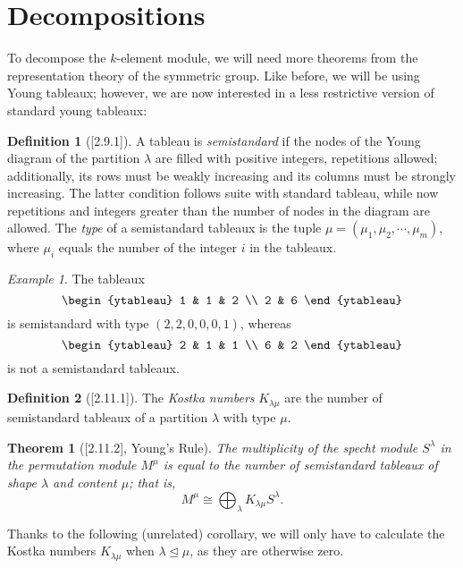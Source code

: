 \documentclass[12pt,twoside]{reedthesis}
\theoremstyle{plain}   %
\newtheorem{thm}{Theorem}[section] %
\theoremstyle{definition}
\newtheorem{defn}{Definition}[section]
\theoremstyle{remark}
\newtheorem{ex}{Example}[section]
\numberwithin{equation}{section}
\def\normeq{\trianglelefteq}
\begin{document}
  \section{Decompositions}
  To decompose the $k$-element module, we will need more theorems from the representation theory of the symmetric group.
  Like before, we will be using Young tableaux; however, we are now interested in a less restrictive version of standard young tableaux:
  \begin{defn}[{\cite{sagan}[2.9.1]}]
    A tableau is \emph{semistandard} if the nodes of the Young diagram of the partition $\lambda$ are filled with positive integers, repetitions allowed;
    additionally, its rows must be weakly increasing and its columns must be strongly increasing.
    The latter condition follows suite with standard tableau, while now repetitions and integers greater than the number of nodes in the diagram are allowed.
    The \emph{type} of a semistandard tableaux is the tuple $\mu = (\mu_1, \mu_2, \cdots, \mu_m)$, where $\mu_i$ equals the number of the integer $i$ in the tableaux.
  \end{defn}
  \begin{ex}
    The tableaux
    \[
      \begin{ytableau}
        1 & 1 & 2 \\
        2 & 6 
      \end{ytableau}
    \]
    is semistandard with type $(2,2,0,0,0,1)$, whereas
    \[
      \begin{ytableau}
        2 & 1 & 1 \\
        6 & 2 
      \end{ytableau}
    \]
    is not a semistandard tableaux.
  \end{ex}
  \begin{defn}[{\cite{sagan}[2.11.1]}]
    The \emph{Kostka numbers} $K_{\lambda \mu }$ are the number of semistandard tableaux of a partition $\lambda$ with type $\mu$.
  \end{defn}
  \begin{thm}[{\cite{sagan}[2.11.2], Young's Rule}]
    The multiplicity of the specht module $S^\lambda$ in the permutation module $M^\mu$ is equal to the number of semistandard tableaux of shape $\lambda$ and content $\mu$; that is,
    \[ M^\mu \cong \bigoplus_\lambda K_{\lambda \mu} S^\lambda .\]
  \end{thm}
  Thanks to the following (unrelated) corollary, we will only have to calculate the Kostka numbers $K_{\lambda \mu}$ when $\lambda \normeq \mu$, as they are otherwise zero.
\end{document}

